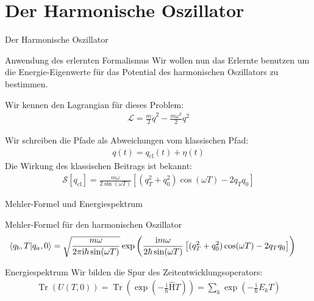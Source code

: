 \section{Der Harmonische Oszillator}
\begin{frame}{Der Harmonische Oszillator}
\begin{block}{\hfill Anwendung des erlernten Formalismus \hfill}
Wir wollen nun das Erlernte benutzen um die Energie-Eigenwerte für das  Potential des harmonischen Oszillators zu bestimmen.
\end{block}
Wir kennen den Lagrangian für dieses Problem: 
\begin{align*}
	\mathcal{L} = \frac{m}{2}\dot{q}^2 - \frac{m\omega^2}{2} q^2
\end{align*}

Wir schreiben die Pfade als Abweichungen vom klassischen Pfad:
\begin{align*}
	q(t) = q_{\text{cl}}(t) + \eta(t)
\end{align*}
Die Wirkung des klassischen Beitrags ist bekannt:
\begin{align*}
	\mathcal{S}[q_{\text{cl}}] = \frac{m\omega}{2\sin(\omega T)}\left[(q_T^2+q_0^2)\cos(\omega T)- 2q_Tq_0\right]
\end{align*}
\end{frame}

\begin{frame}{Mehler-Formel und Energiespektrum}
\begin{block}{\hfill Mehler-Formel für den harmonischen Oszillator\hfill }
	\begin{align*}
	\hspace{-0.5cm}
		\braket{q_b,T}{q_a,0} = \sqrt{\frac{m\omega}{2\pi\mathrm{i}\hbar \sin(\omega T)}} \exp\left(\frac{\mathrm{i}m\omega}{2\hbar\sin(\omega T)}\left[(q_T^2+q_0^2)\cos(\omega T)- 2q_Tq_0\right] \right)
	\end{align*}
\end{block}

\vfill
\begin{block}{\hfill Energiespektrum \hfill}
Wir bilden die Spur des Zeitentwicklungsoperators:
\begin{align*}
	\operatorname{Tr}(U(T,0)) = \operatorname{Tr}\left(\exp\left(-\frac{\mathrm{i}}{\hbar}\hat{\text{H}}T\right)\right) 
	= \sum_k \exp\left(-\frac{\mathrm{i}}{\hbar}E_k T \right)
\end{align*}
\end{block}	
\end{frame}

